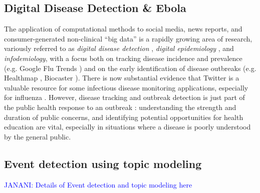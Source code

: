 \documentclass[letterpaper]{article}
\begin{document}
\subsection{Digital Disease Detection \& Ebola}
The application of computational methods to social media, news
reports, and 
consumer-generated non-clinical ``big data'' is a rapidly growing area
of research, variously referred to as \emph{digital disease detection}
\cite{Brownstein:2009aa},
\emph{digital epidemiology} \cite{Salathe:2012aa}, and \emph{infodemiology}\cite{Eysenbach:2009aa}, with a focus
both on tracking disease incidence and prevalence (e.g. Google Flu
Trends \cite{Cook:2011aa})
and on the early identification of disease outbreaks (e.g. Healthmap \cite{Freifeld:2008aa},
Biocaster \cite{Collier:2008aa}).   There is now substantial evidence
that Twitter is a valuable resource for some infectious disease
monitoring applications, especially for influenza
\cite{Signorini:2011aa,Collier:2011aa}.
However, 
disease tracking and outbreak detection is just part of the public
health response to an outbreak \cite{Oyeyemi:2014aa}: understanding the strength and duration of public concerns, 
and identifying potential opportunities for health education are
vital, especially in situations where a disease is poorly
understood\cite{SteelFisher:2015aa} by the general public.  






\subsection{Event detection using topic modeling}
\textcolor{blue}{JANANI:  Details of Event detection and topic modeling here} 



%



\end{document}
